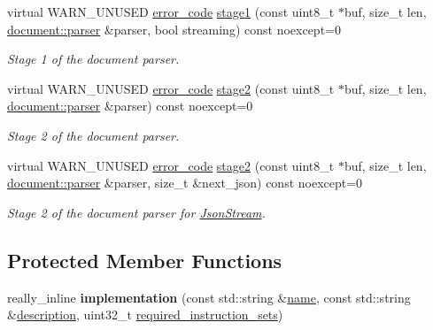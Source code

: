 \begin{DoxyCompactItemize}
virtual W\+A\+R\+N\+\_\+\+U\+N\+U\+S\+ED \hyperlink{namespacesimdjson_a7b735a3a50ba79e3f7f14df5f77d8da9}{error\+\_\+code} \hyperlink{classsimdjson_1_1implementation_acecce36fb2291be439f03116e19426e7}{stage1} (const uint8\+\_\+t $\ast$buf, size\+\_\+t len, \hyperlink{classsimdjson_1_1document_1_1parser}{document\+::parser} \&parser, bool streaming) const noexcept=0
\begin{DoxyCompactList}\small\item\em Stage 1 of the document parser. \end{DoxyCompactList}\item 
virtual W\+A\+R\+N\+\_\+\+U\+N\+U\+S\+ED \hyperlink{namespacesimdjson_a7b735a3a50ba79e3f7f14df5f77d8da9}{error\+\_\+code} \hyperlink{classsimdjson_1_1implementation_a1fcedef10b246c08be2655765a179e64}{stage2} (const uint8\+\_\+t $\ast$buf, size\+\_\+t len, \hyperlink{classsimdjson_1_1document_1_1parser}{document\+::parser} \&parser) const noexcept=0
\begin{DoxyCompactList}\small\item\em Stage 2 of the document parser. \end{DoxyCompactList}\item 
virtual W\+A\+R\+N\+\_\+\+U\+N\+U\+S\+ED \hyperlink{namespacesimdjson_a7b735a3a50ba79e3f7f14df5f77d8da9}{error\+\_\+code} \hyperlink{classsimdjson_1_1implementation_ad58e8c39c7562adcc0a3c55de12e9c4f}{stage2} (const uint8\+\_\+t $\ast$buf, size\+\_\+t len, \hyperlink{classsimdjson_1_1document_1_1parser}{document\+::parser} \&parser, size\+\_\+t \&next\+\_\+json) const noexcept=0
\begin{DoxyCompactList}\small\item\em Stage 2 of the document parser for \hyperlink{classsimdjson_1_1_json_stream}{Json\+Stream}. \end{DoxyCompactList}\end{DoxyCompactItemize}
\subsection*{Protected Member Functions}
\begin{DoxyCompactItemize}
\item 
\mbox{\label{classsimdjson_1_1implementation_ad7348eee7a285356a7a06fee316b9122}} 
really\+\_\+inline {\bfseries implementation} (const std\+::string \&\hyperlink{classsimdjson_1_1implementation_a404c32ec6187ac0fb5b2ec6b5aea4abd}{name}, const std\+::string \&\hyperlink{classsimdjson_1_1implementation_a4f41daefefc573e20fccd591b158e063}{description}, uint32\+\_\+t \hyperlink{classsimdjson_1_1implementation_a64a43c16f8dfcec3c20c05c17b43b753}{required\+\_\+instruction\+\_\+sets})
\end{DoxyCompactItemize}


